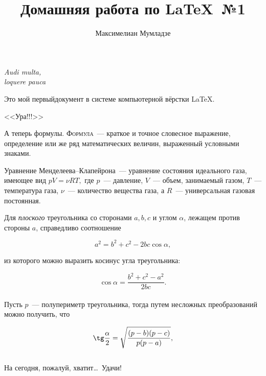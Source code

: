\documentclass[12pt]{article}
\title{Домашняя работа по \LaTeX ~№1}
\author{Максимелиан Мумладзе}
\date{}
\begin{document}
\maketitle

\begin{flushright}
\hfill\textit{Audi multa,\\loquere pauca}
\end{flushright}

\vspace{20pt}

Это мой первый\iffalse в кольце вычета $\approx 20$)\fi документ в системе компьютерной вёрстки \LaTeX.

\begin{center}
\Huge{\sffamily <<Ура!!!>>}
\end{center}

А теперь формулы. \textsc{Формула}~--- краткое и точное словесное выражение, определение или же ряд математических величин, выраженный условными знаками.

\vspace{15pt}

\hspace{28pt}{\large\bfseries Термодинамика}

Уравнение Менделеева--Клапейрона~--- уравнение состояния идеального газа, имеющее вид $pV = \nu RT,$ где $p$~--- давление, $V$~--- объем, занимаемый газом, $T$~--- температура газа, $\nu$~--- количество вещества газа, а $R$~--- универсальная газовая постоянная.

\vspace{15pt}

\hspace{28pt}{\large\bfseries Геометрия \hfill Планиметрия}

Для \textsl{плоского} треугольника со сторонами $a, b, c$ и углом $\alpha$, лежащем против стороны $a$, справедливо соотношение

$$
a^2 = b^2 + c^2 - 2 b c \cos\alpha,
$$

из которого можно выразить косинус угла треугольника:

$$
\cos\alpha = \frac{b^2 + c^2 - a^2}{2bc}.
$$\\

Пусть $p$~--- полупериметр треугольника, тогда путем несложных преобразований можно получить, что 

$$
\tg\frac{\alpha}{2} = \sqrt{\frac{(p - b)(p - c)}{p(p - a)}},
$$\\[1cm] На сегодня, пожалуй, хватит\dots ~Удачи!
\end{document}
